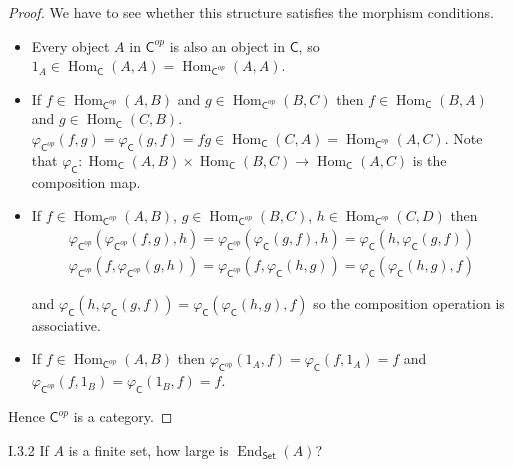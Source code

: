 \begin{proof}
	We have to see whether this structure satisfies the morphism conditions.
	\begin{itemize}
		\item Every object $A$ in ${\mathsf{C}}^{op}$ is also an object in $\mathsf{C}$, so $1_{A} \in \operatorname{Hom}_{\mathsf{C}}(A, A) = \operatorname{Hom}_{{\mathsf{C}}^{op}}(A, A)$.
		\item If $f\in \operatorname{Hom}_{{\mathsf{C}}^{op}}(A, B)$ and $g\in \operatorname{Hom}_{{\mathsf{C}}^{op}}(B, C)$ then $f\in \operatorname{Hom}_{\mathsf{C}}(B, A)$ and $g\in \operatorname{Hom}_{\mathsf{C}}(C, B)$. $\varphi_{{\mathsf{C}}^{op}}(f, g) = \varphi_{\mathsf{C}}(g, f) = fg\in \operatorname{Hom}_{\mathsf{C}}(C, A) = \operatorname{Hom}_{{\mathsf{C}}^{op}}(A, C)$. Note that $\varphi_{\mathsf{C}}: \operatorname{Hom}_{\mathsf{C}}(A, B)\times \operatorname{Hom}_{\mathsf{C}}(B, C)\to \operatorname{Hom}_{\mathsf{C}}(A, C)$ is the composition map.
		\item If $f\in \operatorname{Hom}_{{\mathsf{C}}^{op}}(A, B)$, $g\in \operatorname{Hom}_{{\mathsf{C}}^{op}}(B, C)$, $h\in \operatorname{Hom}_{{\mathsf{C}}^{op}}(C, D)$ then
		      \begin{align*}
			      \varphi_{{\mathsf{C}}^{op}}(\varphi_{{\mathsf{C}}^{op}}(f, g), h) = \varphi_{{\mathsf{C}}^{op}}(\varphi_{\mathsf{C}}(g, f), h) = \varphi_{\mathsf{C}}(h, \varphi_{\mathsf{C}}(g, f)) \\
			      \varphi_{{\mathsf{C}}^{op}}(f, \varphi_{{\mathsf{C}}^{op}}(g, h)) = \varphi_{{\mathsf{C}}^{op}}(f, \varphi_{\mathsf{C}}(h, g)) = \varphi_{\mathsf{C}}(\varphi_{\mathsf{C}}(h, g), f)
		      \end{align*}

		      and $\varphi_{\mathsf{C}}(h, \varphi_{\mathsf{C}}(g, f)) = \varphi_{\mathsf{C}}(\varphi_{\mathsf{C}}(h, g), f)$ so the composition operation is associative.
		\item If $f\in \operatorname{Hom}_{{\mathsf{C}}^{op}}(A, B)$ then $\varphi_{{\mathsf{C}}^{op}}(1_{A}, f) = \varphi_{\mathsf{C}}(f, 1_{A}) = f$ and $\varphi_{{\mathsf{C}}^{op}}(f, 1_{B}) = \varphi_{\mathsf{C}}(1_{B}, f) = f$.
	\end{itemize}

	Hence ${\mathsf{C}}^{op}$ is a category.
\end{proof}

\begin{exercise}{I.3.2}
	If $A$ is a finite set, how large is $\operatorname{End}_{\mathsf{Set}}(A)$?
\end{exercise}

